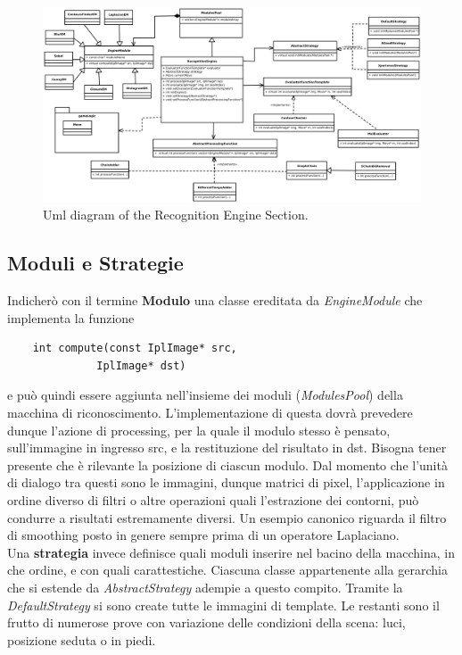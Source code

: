 \documentclass[a4paper,10pt, twocolumn]{article}
\begin{document}
  \begin{figure}[p]
     \centering
    \caption{Uml diagram of the Recognition Engine Section.}
    \label{recognitionEngineDiagram}
    \includegraphics[angle=90, scale=0.5]{UmlDiagrams/recognitionEngine.pdf}
  \end{figure}

  \subsection{Moduli e Strategie}
  Indicher\`{o}
  con il termine \textbf{Modulo} una classe ereditata da \textit{EngineModule} 
  che implementa la funzione
  
  \begin{center}
    \begin{verbatim}
    int compute(const IplImage* src, 
		      IplImage* dst)
    \end{verbatim}
  \end{center}
   e pu\`{o} quindi essere aggiunta nell'insieme dei moduli (\textit{ModulesPool})
  della macchina di riconoscimento.
  L'implementazione di questa dovr\`{a} prevedere dunque l'azione di processing, 
  per la quale il modulo stesso 
  \`{e} pensato, sull'immagine in ingresso src, e la restituzione del risultato in dst.
  Bisogna tener presente che \`{e} rilevante la posizione di ciascun modulo.
  Dal momento che l'unit\`{a} di dialogo tra questi sono le immagini, dunque matrici
  di pixel, l'applicazione in ordine diverso di filtri o altre operazioni quali l'estrazione
  dei contorni, pu\`{o} condurre a risultati estremamente diversi. Un esempio canonico
  riguarda il filtro di smoothing posto in genere sempre prima di un operatore Laplaciano.\\
  Una \textbf{strategia} invece definisce quali moduli inserire nel bacino della macchina,
  in che ordine, e con quali carattestiche. Ciascuna classe appartenente alla gerarchia
  che si estende da \textit{AbstractStrategy} adempie a questo compito. Tramite la 
  \textit{DefaultStrategy} si sono create tutte le immagini di template.
  Le restanti sono il frutto di numerose prove con variazione delle condizioni 
  della scena: luci, posizione seduta o in piedi.  
  
\end{document}
